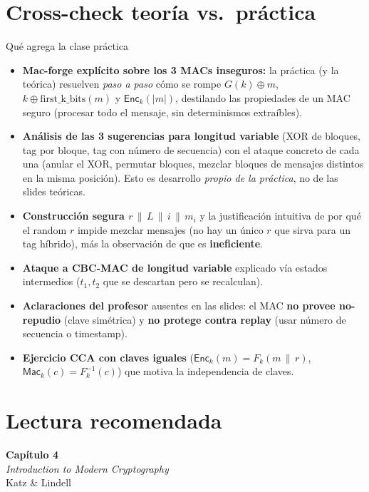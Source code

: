 \documentclass[11pt,a4paper]{article}
\newcommand{\xor}{\oplus}
\newcommand{\concat}{\,\|\,}
\newcommand{\Mac}{\mathsf{Mac}}
\newcommand{\Enc}{\mathsf{Enc}}
\begin{document}
\section*{Cross-check teoría vs.\ práctica}
\begin{practbox}{Qué agrega la clase práctica}
\begin{itemize}[leftmargin=1.4em,itemsep=3pt]
  \item \textbf{Mac-forge explícito sobre los 3 MACs inseguros:} la práctica (y la teórica)
        resuelven \emph{paso a paso} cómo se rompe $G(k)\xor m$, $k\xor\mathrm{first\_k\_bits}
        (m)$ y $\Enc_k(|m|)$, destilando las propiedades de un MAC seguro (procesar todo el
        mensaje, sin determinismos extraíbles).
  \item \textbf{Análisis de las 3 sugerencias para longitud variable} (XOR de bloques, tag
        por bloque, tag con número de secuencia) con el ataque concreto de cada una
        (anular el XOR, permutar bloques, mezclar bloques de mensajes distintos en la misma
        posición). Esto es desarrollo \emph{propio de la práctica}, no de las slides
        teóricas.
  \item \textbf{Construcción segura $r\concat L\concat i\concat m_i$} y la justificación
        intuitiva de por qué el random $r$ impide mezclar mensajes (no hay un único $r$ que
        sirva para un tag híbrido), más la observación de que es \textbf{ineficiente}.
  \item \textbf{Ataque a CBC-MAC de longitud variable} explicado vía estados intermedios
        ($t_1,t_2$ que se descartan pero se recalculan).
  \item \textbf{Aclaraciones del profesor} ausentes en las slides: el MAC \textbf{no provee
        no-repudio} (clave simétrica) y \textbf{no protege contra replay} (usar número de
        secuencia o timestamp).
  \item \textbf{Ejercicio CCA con claves iguales} ($\Enc_k(m)=F_k(m\concat r)$,
        $\Mac_k(c)=F^{-1}_k(c)$) que motiva la independencia de claves.
\end{itemize}
\end{practbox}

\section*{Lectura recomendada}
\begin{center}
\begin{tcolorbox}[enhanced,colback=itbaBlue!20,colframe=itbaCyanDark,boxrule=1pt,
  arc=3pt,width=0.85\textwidth,halign=center]
\large\textbf{Capítulo 4}\\[4pt]
\emph{Introduction to Modern Cryptography}\\[2pt]
Katz \& Lindell
\end{tcolorbox}
\end{center}
\end{document}
